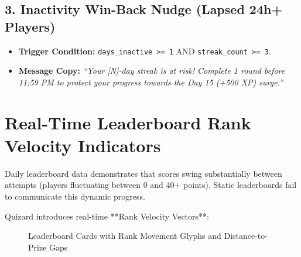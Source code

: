 \subsection{3. Inactivity Win-Back Nudge (Lapsed 24h+ Players)}
\begin{itemize}
    \item \textbf{Trigger Condition:} \texttt{days\_inactive >= 1} AND \texttt{streak\_count >= 3}.
    \item \textbf{Message Copy:} \textit{``Your [N]-day streak is at risk! Complete 1 round before 11:59 PM to protect your progress towards the Day 15 (+500 XP) surge.''}
\end{itemize}

\section{Real-Time Leaderboard Rank Velocity Indicators}
Daily leaderboard data demonstrates that scores swing substantially between attempts (players fluctuating between 0 and 40+ points). Static leaderboards fail to communicate this dynamic progress.

Quizard introduces real-time **Rank Velocity Vectors**:

\begin{figure}[htbp]
\centering
{}
\caption{Leaderboard Cards with Rank Movement Glyphs and Distance-to-Prize Gaps}
\end{figure}


